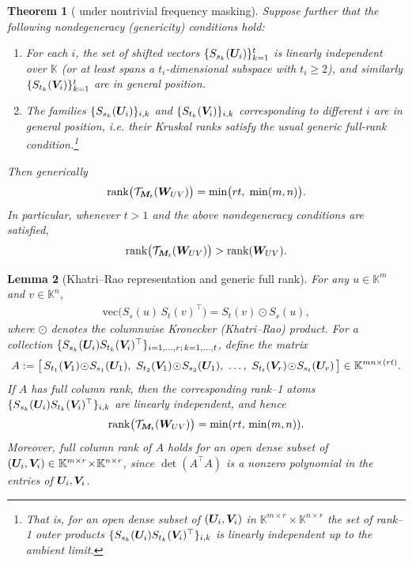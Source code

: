 \documentclass{article}
\theoremstyle{plain}
\newtheorem{theorem}{Theorem}[section]
\newtheorem{lemma}[theorem]{Lemma}
\theoremstyle{definition}
\theoremstyle{remark}
\begin{document}
\begin{theorem}[ under nontrivial frequency masking]
Suppose further that the following \emph{nondegeneracy (genericity) conditions} hold:
\begin{enumerate}
\item For each $i$, the set of shifted vectors $\{S_{s_k}({\bm{U}}_i)\}_{k=1}^{t}$ is linearly independent over $\mathbb{K}$ (or at least spans a $t_i$-dimensional subspace with $t_i\ge 2$), and similarly $\{S_{t_k}({\bm{V}}_i)\}_{k=1}^{t}$ are in general position.
\item The families $\{S_{s_k}({\bm{U}}_i)\}_{i,k}$ and $\{S_{t_k}({\bm{V}}_i)\}_{i,k}$ corresponding to different $i$ are in general position, i.e. their Kruskal ranks satisfy the usual generic full-rank condition.\footnote{That is, for an open dense subset of $({\bm{U}}_i,{\bm{V}}_i)$ in $\mathbb{K}^{m\times r}\times\mathbb{K}^{n\times r}$ the set of rank--1 outer products $\{S_{s_k}({\bm{U}}_i)S_{t_k}({\bm{V}}_i)^\top\}_{i,k}$ is linearly independent up to the ambient limit.}
\end{enumerate}
Then generically
\begin{align}
\operatorname{rank}\!\big(\mathcal{T}_{{\bm{M}}_t}({\bm{W}}_{UV})\big)
  = \min\!\big( rt,\; \min(m,n) \big).
\end{align}
In particular, whenever $t>1$ and the above nondegeneracy conditions are satisfied,
\begin{align}
\operatorname{rank}\!\big(\mathcal{T}_{{\bm{M}}_t}({\bm{W}}_{UV})\big)
   > \operatorname{rank}({\bm{W}}_{UV}).
\end{align}
\end{theorem}

\begin{lemma}[Khatri--Rao representation and generic full rank]
\label{lem:khatri-rao}
For any $u\in\mathbb{K}^m$ and $v\in\mathbb{K}^n$,
\begin{align}
  \mathrm{vec}\!\big(S_s(u)\,S_t(v)^\top\big)
  = S_t(v)\odot S_s(u),
\end{align}
where $\odot$ denotes the columnwise Kronecker (Khatri--Rao) product.
For a collection $\{S_{s_k}({\bm{U}}_i)S_{t_k}({\bm{V}}_i)^\top\}_{i=1,\dots,r;\,k=1,\dots,t}$,
define the matrix
\begin{align}
A := \big[\,S_{t_1}({\bm{V}}_1)\!\odot\!S_{s_1}({\bm{U}}_1),~
   S_{t_2}({\bm{V}}_1)\!\odot\!S_{s_2}({\bm{U}}_1),~
   \dots,~
   S_{t_t}({\bm{V}}_r)\!\odot\!S_{s_t}({\bm{U}}_r)\,\big]
   \in\mathbb{K}^{mn\times (r t)}.
\end{align}
If $A$ has full column rank, then the corresponding rank--1 atoms 
$\{S_{s_k}({\bm{U}}_i)S_{t_k}({\bm{V}}_i)^\top\}_{i,k}$ are linearly independent, and hence
\begin{align}
  \operatorname{rank}\!\big(\mathcal{T}_{{\bm{M}}_t}({\bm{W}}_{UV})\big)
  = \min(rt,\,\min(m,n)).
\end{align}
Moreover, full column rank of $A$ holds for an open dense subset of 
$({\bm{U}}_i,{\bm{V}}_i)\in\mathbb{K}^{m\times r}\!\times\!\mathbb{K}^{n\times r}$,
since $\det(A^\top A)$ is a nonzero polynomial in the entries of ${\bm{U}}_i,{\bm{V}}_i$.
\end{lemma}
\end{document}
